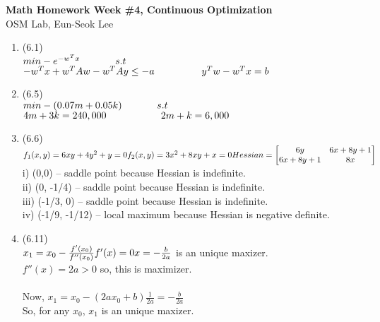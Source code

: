 \documentclass[letterpaper,12pt]{article}
\theoremstyle{definition}
\begin{document}
\begin{flushleft}
   \textbf{\large{Math Homework Week \#4, Continuous Optimization}} \\[5pt]
   OSM Lab, Eun-Seok Lee \\[5pt]

\end{flushleft}

\vspace{5mm}

\begin{enumerate}



	\item (6.1) \\
$min -e^{-w^Tx} \\
\phantom{----}s.t$ $-w^Tx +  w^TAw -w^TAy \leq  - a\\
\phantom{-----}y^Tw - w^Tx  = b$


	\item (6.5) \\
$min -(0.07m + 0.05k) \\
\phantom{----}s.t$ $4m + 3k = 240,000\\
\phantom{------}2m + k = 6,000$

	\item (6.6) \\
$f_1(x,y) = 6xy + 4y^2 + y = 0\\
f_2(x, y) = 3x^2 + 8xy + x = 0\\  \\
Hessian =  \begin{bmatrix} 6y& 6x+8y+1 \\ 6x+8y+1& 8x \end{bmatrix}\\$
i) (0,0) -- saddle point because Hessian is indefinite.\\
ii) (0, -1/4) -- saddle point because Hessian is indefinite.\\
iii) (-1/3, 0) -- saddle point because Hessian is indefinite.\\
iv) (-1/9, -1/12) -- local maximum because Hessian is negative definite.\\


	\item (6.11) \\
$ x_1 = x_0 - \frac{f'(x_0)}{f''(x_0)}\\
f'(x) = 0\\
x = -\frac{b}{2a} $ is an unique maxizer. \\
$f''(x) = 2a > 0$ so, this is maximizer. \\
\\
Now, $x_1 = x_0 - (2ax_0 +b)\frac{1}{2a} = -\frac{b}{2a}$ \\
So, for any $x_0$, $x_1$ is an unique maxizer.
 



\end{enumerate}
\end{document}
